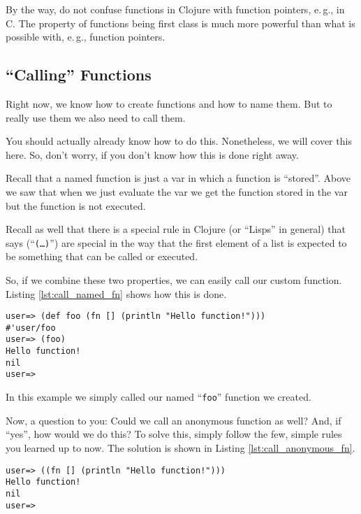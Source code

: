 By the way, do not confuse functions in Clojure with function pointers, e.\,g., in C.
The property of functions being first class is much more powerful than what is possible with, e.\,g., function pointers.

\subsection{``Calling'' Functions}
Right now, we know how to create functions and how to name them.
But to really use them we also need to call them.

You should actually already know how to do this.
Nonetheless, we will cover this here.
So, don't worry, if you don't know how this is done right away.

Recall that a named function is just a var in which a function is ``stored''.
Above we saw that when we just evaluate the var we get the function stored in the var but the function is not executed.

Recall as well that there is a special rule in Clojure (or ``Lisps'' in general) that says  (``\texttt{(\ldots)}'') are special in the way that the first element of a list is expected to be something that can be called or executed.

So, if we combine these two properties, we can easily call our custom function.
Listing \vref{lst:call_named_fn} shows how this is done.

\begin{lstlisting}[label=lst:call_named_fn, caption=``Call'' a Named Function]
user=> (def foo (fn [] (println "Hello function!")))
#'user/foo
user=> (foo)
Hello function!
nil
user=> 
\end{lstlisting}


In this example we simply called our named ``\texttt{foo}'' function we created.

Now, a question to you: Could we call an anonymous function as well?
And, if ``yes'', how would we do this?
To solve this, simply follow the few, simple rules you learned up to now.
The solution is shown in Listing \vref{lst:call_anonymous_fn}.

\newpage

\begin{lstlisting}[label=lst:call_anonymous_fn, caption=``Call'' an Anonymous Function]
user=> ((fn [] (println "Hello function!")))
Hello function!
nil
user=> 
\end{lstlisting}

